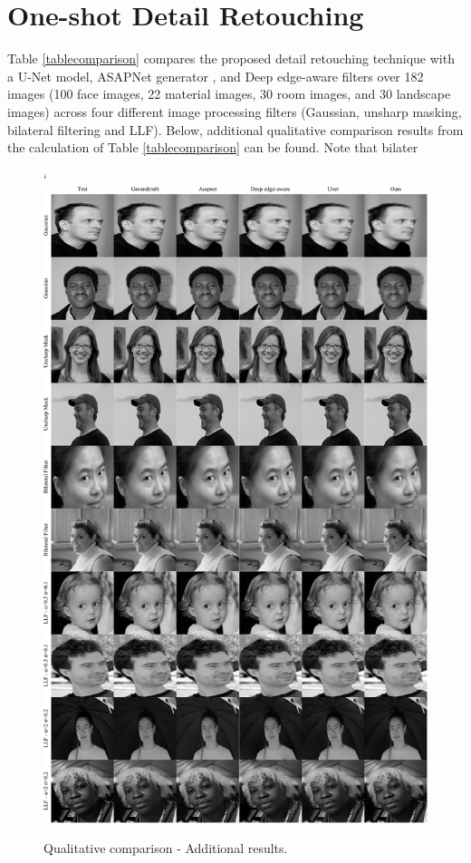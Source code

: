 \chapter{One-shot Detail Retouching}
\label{one-shot-add}
Table \ref{tablecomparison} compares the proposed detail retouching technique with a U-Net model\cite{ronneberger2015u}, ASAPNet generator \cite{shaham2021spatially}, and Deep edge-aware filters \cite{xu2015deep} over 182 images (100 face images, 22 material images, 30 room images, and 30 landscape images) across four different image processing filters (Gaussian, unsharp masking, bilateral filtering and \gls{LLF}). Below, additional qualitative comparison results from the calculation of Table \ref{tablecomparison} can be found. Note that bilater


\begin{figure}[ht]
  \centering
  {`\includegraphics[width=0.8\linewidth]{Chapters/appendix-figs/face.pdf}}

   \caption{Qualitative comparison - Additional results.}
   \label{fig:appendix-DR-face}
\end{figure}

